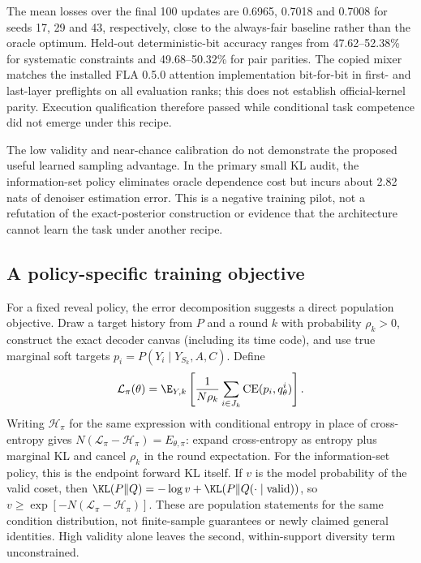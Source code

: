 The mean losses over the final 100 updates are 0.6965, 0.7018 and 0.7008 for seeds 17, 29 and 43, respectively, close to the always-fair baseline rather than the oracle optimum. Held-out deterministic-bit accuracy ranges from 47.62--52.38\% for systematic constraints and 49.68--50.32\% for pair parities. The copied mixer matches the installed FLA 0.5.0 attention implementation bit-for-bit in first- and last-layer preflights on all evaluation ranks; this does not establish official-kernel parity. Execution qualification therefore passed while conditional task competence did not emerge under this recipe.




The low validity and near-chance calibration do not demonstrate the proposed useful learned sampling advantage. In the primary small KL audit, the information-set policy eliminates oracle dependence cost but incurs about 2.82 nats of denoiser estimation error. This is a negative training pilot, not a refutation of the exact-posterior construction or evidence that the architecture cannot learn the task under another recipe.

\subsection{A policy-specific training objective}
For a fixed reveal policy, the error decomposition suggests a direct population objective. Draw a target history from $P$ and a round $k$ with probability $\rho_k>0$, construct the exact decoder canvas (including its time code), and use true marginal soft targets $p_i=P(Y_i\mid Y_{S_k},A,C)$. Define
\begin{equation}
\mathcal L_\pi(\theta)=\E_{Y,k}\left[\frac{1}{N\rho_k}\sum_{i\in J_k}\operatorname{CE}(p_i,q_\theta^i)\right].
\end{equation}
Writing $\mathcal H_\pi$ for the same expression with conditional entropy in place of cross-entropy gives
$N(\mathcal L_\pi-\mathcal H_\pi)=E_{\theta,\pi}$: expand cross-entropy as entropy plus marginal KL and cancel $\rho_k$ in the round expectation. For the information-set policy, this is the endpoint forward KL itself. If $v$ is the model probability of the valid coset, then
$\KL(P\Vert Q)=-\log v+\KL(P\Vert Q(\cdot\mid\mathrm{valid}))$,
so $v\geq\exp[-N(\mathcal L_\pi-\mathcal H_\pi)]$. These are population statements for the same condition distribution, not finite-sample guarantees or newly claimed general identities. High validity alone leaves the second, within-support diversity term unconstrained.

